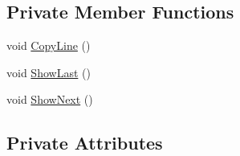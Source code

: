 \subsection*{Private Member Functions}
\begin{DoxyCompactItemize}
\item 
void \hyperlink{classAnsiConoleEngine_ae359fe52bf227c3db6edc42b8fc884f0}{Copy\+Line} ()
\item 
void \hyperlink{classAnsiConoleEngine_afc441f10d1c52dba7b3ca1a5f2514e7c}{Show\+Last} ()
\item 
void \hyperlink{classAnsiConoleEngine_a93c3eccd6c1458e1a82bdbf202948d90}{Show\+Next} ()
\end{DoxyCompactItemize}
\subsection*{Private Attributes}
